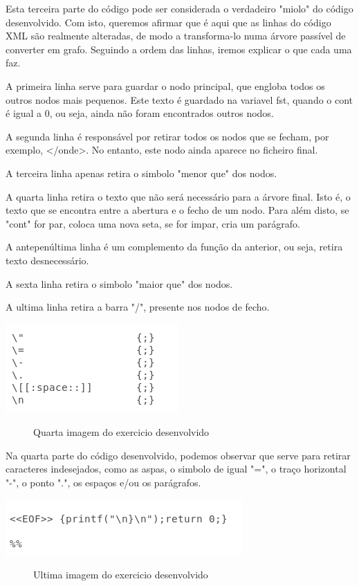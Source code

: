 \documentclass[a4paper]{article}
\begin{document}
Esta terceira parte do código pode ser considerada o verdadeiro "miolo" do código desenvolvido. Com isto, queremos afirmar que é aqui que as  linhas do código XML são realmente alteradas, de modo a transforma-lo numa árvore passível de converter em grafo.
Seguindo a ordem das linhas, iremos explicar o que cada uma faz.

A primeira linha serve para guardar o nodo principal, que engloba todos os outros nodos mais pequenos. Este texto é guardado na variavel fst, quando o cont é igual a 0, ou seja, ainda não foram encontrados outros nodos.

A segunda linha é responsável por retirar todos os nodos que se fecham, por exemplo, </onde>. No entanto, este nodo ainda aparece no ficheiro final.

A terceira linha apenas retira o simbolo "menor que" dos nodos.

A quarta linha retira o texto que não será necessário para a árvore final. Isto é, o texto que se encontra entre a abertura e o fecho de um nodo. Para além disto, se "cont" for par, coloca uma nova seta, se for impar, cria um parágrafo.

A antepenúltima linha é um complemento da função da anterior, ou seja, retira texto desnecessário.

A sexta linha retira o simbolo "maior que" dos nodos.

A ultima linha retira a barra "/", presente nos nodos de fecho.

\begin{center}
	\includegraphics{flex4}
	\begin{figure}[!ht]
	\caption{Quarta imagem do exercicio desenvolvido}
	\end{figure}
\end{center}

Na quarta parte do código desenvolvido, podemos observar que serve para retirar caracteres indesejados, como as aspas, o simbolo de igual "=", o traço horizontal "-", o ponto ".", os espaços e/ou os parágrafos.

\begin{center}
	\includegraphics{flex5}
	\begin{figure}[!ht]
	\caption{Ultima imagem do exercicio desenvolvido}
	\end{figure}
\end{center}
\end{document}
